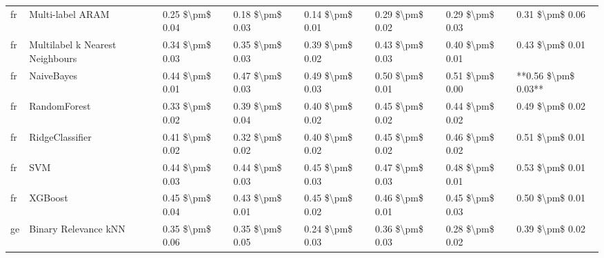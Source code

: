 \begin{tabular}{llllllll}
      fr &                Multi-label ARAM & 0.25 \$\textbackslash pm\$ 0.04 &           0.18 \$\textbackslash pm\$ 0.03 &       0.14 \$\textbackslash pm\$ 0.01 &        0.29 \$\textbackslash pm\$ 0.02 &                         0.29 \$\textbackslash pm\$ 0.03 &     0.31 \$\textbackslash pm\$ 0.06 \\
      fr & Multilabel k Nearest Neighbours & 0.34 \$\textbackslash pm\$ 0.03 &           0.35 \$\textbackslash pm\$ 0.03 &       0.39 \$\textbackslash pm\$ 0.02 &        0.43 \$\textbackslash pm\$ 0.03 &                         0.40 \$\textbackslash pm\$ 0.01 &     0.43 \$\textbackslash pm\$ 0.01 \\
      fr &                      NaiveBayes & 0.44 \$\textbackslash pm\$ 0.01 &           0.47 \$\textbackslash pm\$ 0.03 &       0.49 \$\textbackslash pm\$ 0.03 &        0.50 \$\textbackslash pm\$ 0.01 &                         0.51 \$\textbackslash pm\$ 0.00 & **0.56 \$\textbackslash pm\$ 0.03** \\
      fr &                    RandomForest & 0.33 \$\textbackslash pm\$ 0.02 &           0.39 \$\textbackslash pm\$ 0.04 &       0.40 \$\textbackslash pm\$ 0.02 &        0.45 \$\textbackslash pm\$ 0.02 &                         0.44 \$\textbackslash pm\$ 0.02 &     0.49 \$\textbackslash pm\$ 0.02 \\
      fr &                 RidgeClassifier & 0.41 \$\textbackslash pm\$ 0.02 &           0.32 \$\textbackslash pm\$ 0.02 &       0.40 \$\textbackslash pm\$ 0.02 &        0.45 \$\textbackslash pm\$ 0.02 &                         0.46 \$\textbackslash pm\$ 0.02 &     0.51 \$\textbackslash pm\$ 0.01 \\
      fr &                             SVM & 0.44 \$\textbackslash pm\$ 0.03 &           0.44 \$\textbackslash pm\$ 0.03 &       0.45 \$\textbackslash pm\$ 0.03 &        0.47 \$\textbackslash pm\$ 0.03 &                         0.48 \$\textbackslash pm\$ 0.01 &     0.53 \$\textbackslash pm\$ 0.01 \\
      fr &                         XGBoost & 0.45 \$\textbackslash pm\$ 0.04 &           0.43 \$\textbackslash pm\$ 0.01 &       0.45 \$\textbackslash pm\$ 0.02 &        0.46 \$\textbackslash pm\$ 0.01 &                         0.45 \$\textbackslash pm\$ 0.03 &     0.50 \$\textbackslash pm\$ 0.01 \\
      ge &            Binary Relevance kNN & 0.35 \$\textbackslash pm\$ 0.06 &           0.35 \$\textbackslash pm\$ 0.05 &       0.24 \$\textbackslash pm\$ 0.03 &        0.36 \$\textbackslash pm\$ 0.03 &                         0.28 \$\textbackslash pm\$ 0.02 &     0.39 \$\textbackslash pm\$ 0.02 \\

\end{tabular}
